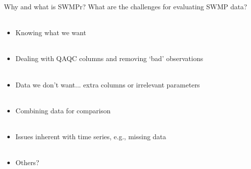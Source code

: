 \documentclass[xcolor=dvipsnames]{beamer}\usepackage[]{graphicx}\usepackage[]{color}
\begin{document}

\begin{frame}[t]{Why and what is SWMPr?}
\onslide<+->
What are the challenges for evaluating SWMP data? \\~\\
\onslide<+->
\begin{itemize}
\item Knowing what we want \\~\\
\item Dealing with QAQC columns and removing `bad' observations \\~\\
\item Data we don't want... extra columns or irrelevant parameters \\~\\
\item Combining data for comparison\\~\\
\item Issues inherent with time series, e.g., missing data \\~\\
\item Others?
\end{itemize}
\end{frame}
\end{document}
